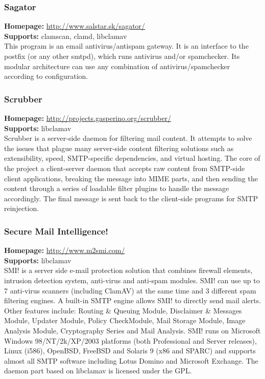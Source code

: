 \documentclass[a4paper,titlepage,12pt]{article}
\begin{document}
    \subsubsection{Sagator}
    \textbf{Homepage:} \url{http://www.salstar.sk/sagator/}\\
    \textbf{Supports:} clamscan, clamd, libclamav\\[4pt]
    This program is an email antivirus/antispam gateway. It is an interface
    to the postfix (or any other smtpd), which runs antivirus
    and/or spamchecker. Its modular architecture can use any
    combination of antivirus/spamchecker according to configuration.

    \subsubsection{Scrubber}
    \textbf{Homepage:} \url{http://projects.gasperino.org/scrubber/}\\
    \textbf{Supports:} libclamav\\[4pt]
    Scrubber is a server-side daemon for filtering mail content. It attempts
    to solve the issues that plague many server-side content filtering
    solutions such as extensibility, speed, SMTP-specific dependencies, and
    virtual hosting. The core of the project a client-server daemon that
    accepts raw content from SMTP-side client applications, breaking the
    message into MIME parts, and then sending the content through a series of
    loadable filter plugins to handle the message accordingly. The final
    message is sent back to the client-side programs for SMTP reinjection.

    \subsubsection{Secure Mail Intelligence!}
    \textbf{Homepage:} \url{http://www.m2smi.com/}\\
    \textbf{Supports:} libclamav\\[4pt]
    SMI! is a server side e-mail protection solution that combines firewall
    elements, intrusion detection system, anti-virus and anti-spam modules.
    SMI! can use up to 7 anti-virus scanners (including ClamAV) at the same
    time and 3 different spam filtering engines. A built-in SMTP engine allows 
    SMI! to directly send mail alerts. Other features include: Routing \&
    Queuing Module, Disclaimer \& Messages Module, Updater Module, Policy
    CheckModule, Mail Storage Module, Image Analysis Module, Cryptography
    Series and Mail Analysis. SMI! runs on Microsoft Windows 98/NT/2k/XP/2003
    platforms (both Professional and Server releases), Linux (i586), OpenBSD,
    FreeBSD and Solaris 9 (x86 and SPARC) and supports almost all SMTP software
    including Lotus Domino and Microsoft Exchange. The daemon part based on
    libclamav is licensed under the GPL.
\end{document}

